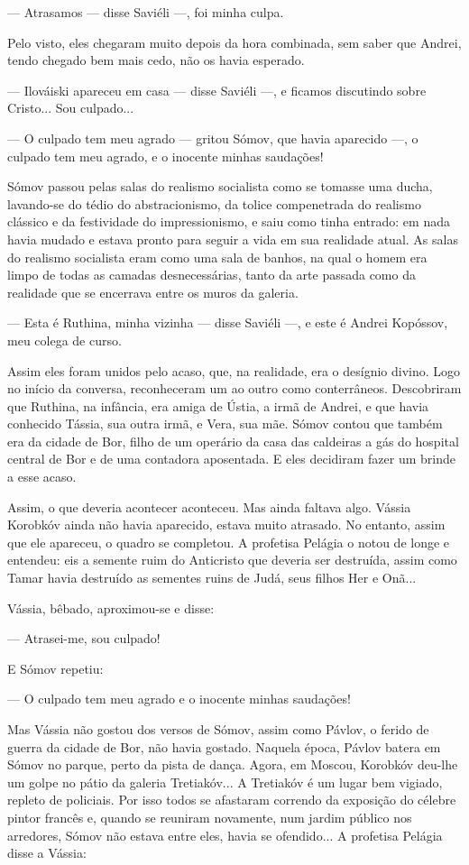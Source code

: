 --- Atrasamos --- disse Saviéli ---, foi minha culpa.

Pelo visto, eles chegaram muito depois da hora combinada, sem saber que
Andrei, tendo chegado bem mais cedo, não os havia esperado.

--- Ilováiski apareceu em casa --- disse Saviéli ---, e ficamos
discutindo sobre Cristo... Sou culpado...

--- O culpado tem meu agrado --- gritou Sómov, que havia aparecido ---,
o culpado tem meu agrado, e o inocente minhas saudações!

Sómov passou pelas salas do realismo socialista como se tomasse uma
ducha, lavando-se do tédio do abstracionismo, da tolice compenetrada do
realismo clássico e da festividade do impressionismo, e saiu como tinha
entrado: em nada havia mudado e estava pronto para seguir a vida em sua
realidade atual. As salas do realismo socialista eram como uma sala de
banhos, na qual o homem era limpo de todas as camadas desnecessárias,
tanto da arte passada como da realidade que se encerrava entre os muros
da galeria.

--- Esta é Ruthina, minha vizinha --- disse Saviéli ---, e este é Andrei
Kopóssov, meu colega de curso.

Assim eles foram unidos pelo acaso, que, na realidade, era o desígnio
divino. Logo no início da conversa, reconheceram um ao outro como
conterrâneos. Descobriram que Ruthina, na infância, era amiga de Ústia,
a irmã de Andrei, e que havia conhecido Tássia, sua outra irmã, e Vera,
sua mãe. Sómov contou que também era da cidade de Bor, filho de um
operário da casa das caldeiras a gás do hospital central de Bor e de uma
contadora aposentada. E eles decidiram fazer um brinde a esse acaso.

Assim, o que deveria acontecer aconteceu. Mas ainda faltava algo. Vássia
Korobkóv ainda não havia aparecido, estava muito atrasado. No entanto,
assim que ele apareceu, o quadro se completou. A profetisa Pelágia o
notou de longe e entendeu: eis a semente ruim do Anticristo que deveria
ser destruída, assim como Tamar havia destruído as sementes ruins de
Judá, seus filhos Her e Onã...

Vássia, bêbado, aproximou-se e disse:

--- Atrasei-me, sou culpado!

E Sómov repetiu:

--- O culpado tem meu agrado e o inocente minhas saudações!

Mas Vássia não gostou dos versos de Sómov, assim como Pávlov, o ferido
de guerra da cidade de Bor, não havia gostado. Naquela época, Pávlov
batera em Sómov no parque, perto da pista de dança. Agora, em Moscou,
Korobkóv deu-lhe um golpe no pátio da galeria Tretiakóv... A Tretiakóv é
um lugar bem vigiado, repleto de policiais. Por isso todos se afastaram
correndo da exposição do célebre pintor francês e, quando se reuniram
novamente, num jardim público nos arredores, Sómov não estava entre
eles, havia se ofendido... A profetisa Pelágia disse a Vássia:

